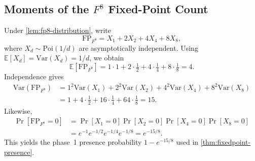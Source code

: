 \documentclass[version=preprint]{iacrcc}
\begin{document}
\subsection{Moments of the \texorpdfstring{$F^8$}{F8} Fixed-Point Count}\label{app:proof-fp8-moments}

Under \autoref{lem:fp8-distribution}, write
\[
\mathrm{FP}_{F^8} = X_1 + 2X_2 + 4X_4 + 8X_8,
\]
where $X_d \sim \mathrm{Poi}(1/d)$ are asymptotically independent.
Using $\mathbb{E}[X_d]=\mathrm{Var}(X_d)=1/d$, we obtain
\[
\mathbb{E}[\mathrm{FP}_{F^8}] = 1\cdot 1 + 2\cdot \tfrac12 + 4\cdot \tfrac14 + 8\cdot \tfrac18 = 4.
\]
Independence gives
\[
\begin{aligned}
\mathrm{Var}(\mathrm{FP}_{F^8})
&= 1^2\mathrm{Var}(X_1)+2^2\mathrm{Var}(X_2)+4^2\mathrm{Var}(X_4)+8^2\mathrm{Var}(X_8) \\
&= 1 + 4\cdot \tfrac12 + 16\cdot \tfrac14 + 64\cdot \tfrac18 = 15.
\end{aligned}
\]
Likewise,
\[
\begin{aligned}
\Pr[\mathrm{FP}_{F^8}=0]
&= \Pr[X_1=0]\Pr[X_2=0]\Pr[X_4=0]\Pr[X_8=0] \\
&= e^{-1} e^{-1/2} e^{-1/4} e^{-1/8} = e^{-15/8}.
\end{aligned}
\]
This yields the phase~1 presence probability $1-e^{-15/8}$ used in \autoref{thm:fixedpoint-presence}.
\end{document}
